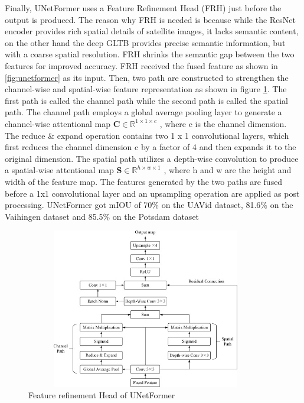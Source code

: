 Finally, UNetFormer uses a Feature Refinement Head (FRH) just before the output is produced. The reason why FRH is needed is because while the ResNet encoder provides rich spatial details of satellite images, it lacks semantic content, on the other hand the deep GLTB provides precise semantic information, but with a coarse spatial resolution. FRH shrinks the semantic gap between the two features for improved accuracy. FRH received the fused feature as shown in \ref{fig:unetformer} as its input. Then, two path are constructed to strengthen the channel-wise and spatial-wise feature representation as shown in figure \ref{fig:frh}. The first path is called the channel path while the second path is called the spatial path. The channel path employs a global average pooling layer to generate a channel-wise attentional map $\textbf{C} \in \mathbb{R}^{1\times 1 \times c}$ , where c is the channel dimension. The reduce \& expand operation contains two 1 x 1 convolutional layers, which first reduces the channel dimension c by a factor of 4 and then expands it to the original dimension. The spatial path utilizes a depth-wise convolution to produce a spatial-wise attentional map $\textbf{S} \in \mathbb{R}^{h\times w \times 1}$  , where h and w are the height and width of the feature map. The features generated by the two paths are fused before a 1x1 convolutional layer and an upsampling operation are applied as post processing. UNetFormer got mIOU of 70\% on the UAVid dataset, 81.6\% on the Vaihingen dataset and 85.5\% on the Potsdam dataset



\FloatBarrier

\begin{figure}[ht]
\includegraphics[width=10.5cm, height=7cm]{images/frh.jpg}
\centering
\caption{Feature refinement Head of UNetFormer}
\label{fig:frh}
\end{figure}

